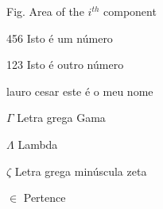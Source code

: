 \documentclass[
	12pt,				%
	oneside,          %
	a4paper,			%
	chapter=TITLE,		%
	section=TITLE,		%
	subsection=TITLE,	%
	english,			%
	brazil,				%
	]{abntUnoesc}
\begin{document}
\frenchspacing 


\imprimircapa

\imprimirfolhaderosto









\listoffigures*
\cleardoublepage


\listoftables*
\cleardoublepage  %

\begin{siglas}
  \item[Fig.] Area of the $i^{th}$ component
  \item[456] Isto é um número
  \item[123] Isto é outro número
  \item[lauro cesar] este é o meu nome
\end{siglas}

\begin{simbolos}
  \item[$ \Gamma $] Letra grega Gama
  \item[$ \Lambda $] Lambda
  \item[$ \zeta $] Letra grega minúscula zeta
  \item[$ \in $] Pertence
\end{simbolos}

\tableofcontents*
\cleardoublepage

\textual



\end{document}
